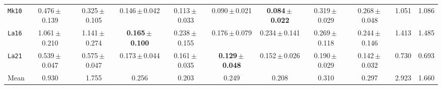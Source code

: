 \begin{table}[htbp]
\begin{tabular}{lcccccccccc}
\texttt{Mk10} & 0.476\,$\pm$\,0.139 & 0.325\,$\pm$\,0.105 & 0.146\,$\pm$\,0.042 & 0.113\,$\pm$\,0.033 & 0.090\,$\pm$\,0.021 & \textbf{0.084\,$\pm$\,0.022} & 0.319\,$\pm$\,0.029 & 0.268\,$\pm$\,0.048 & 1.051 & 1.086 \\
\texttt{La16} & 1.061\,$\pm$\,0.210 & 1.141\,$\pm$\,0.274 & \textbf{0.165\,$\pm$\,0.100} & 0.238\,$\pm$\,0.155 & 0.176\,$\pm$\,0.079 & 0.234\,$\pm$\,0.141 & 0.269\,$\pm$\,0.118 & 0.244\,$\pm$\,0.146 & 1.413 & 1.485 \\
\texttt{La21} & 0.539\,$\pm$\,0.047 & 0.575\,$\pm$\,0.047 & 0.173\,$\pm$\,0.044 & 0.161\,$\pm$\,0.035 & \textbf{0.129\,$\pm$\,0.048} & 0.152\,$\pm$\,0.026 & 0.190\,$\pm$\,0.029 & 0.142\,$\pm$\,0.032 & 0.730 & 0.693 \\
\midrule
Mean & 0.930 & 1.755 & 0.256 & 0.203 & 0.249 & 0.208 & 0.310 & 0.297 & 2.923 & 1.660 \\
\bottomrule
\end{tabular}
\end{table}
